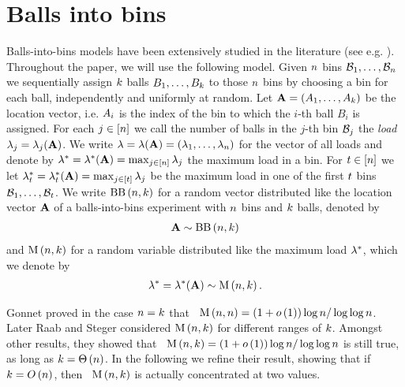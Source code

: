\section{Balls into bins}\label{MDsec:balls_bins}
Balls-into-bins models have been extensively studied in the literature (see e.g. \cite{JohnsonKotz1977, MitzenmacherUpfal2017}). Throughout the paper, we will use the following model. Given $n$ bins $\mathcal{B}_1, \ldots, \mathcal{B}_n$ we sequentially assign $k$ balls $B_1, \ldots, B_k$ to those $n$ bins by choosing a bin for each ball, independently and uniformly at random. Let $\mathbf{A}=\left(A_1, \ldots, A_k\right)$ be the location vector, i.e. $A_i$ is the index of the bin to which the $i$-th ball $B_i$ is assigned. For each $j\in [n]$ we call the number of balls in the $j$-th bin $\mathcal{B}_j$ the {\em load} $\lambda_j=\lambda_j(\mathbf{A})$. We write $\mathbf{\lambda}=\mathbf{\lambda}(\mathbf{A})=\left(\lambda_1, \ldots, \lambda_n\right)$ for the vector of all loads and denote by $\lambda^\ast=\lambda^\ast(\mathbf{A})=\max_{j \in [n]}\lambda_j$ the maximum load in a bin. For $t\in[n]$ we let $\lambda^\ast_{ t}=\lambda^\ast_{t}(\mathbf{A})=\max_{j \in [t]}\lambda_j$ be the maximum load in one of the first $t$ bins $\mathcal{B}_1, \ldots, \mathcal{B}_t$. We write $\operatorname{BB}\left(n, k\right)$ for a random vector distributed like the location vector $\mathbf{A}$ of a balls-into-bins experiment with $n$ bins and $k$ balls, denoted by 
\begin{align*}
\mathbf{A}\sim \operatorname{BB}\left(n, k\right)
\end{align*}
and $\operatorname{M}\left(n, k\right)$ for a random variable distributed like the maximum load $\lambda^\ast$, which we denote by
\begin{align*}
\lambda^\ast=\lambda^\ast(\mathbf{A})\sim \operatorname{M}\left(n, k\right).
\end{align*}

Gonnet \cite{Gonnet1981} proved in the case $n=k$ that \whp\ $\operatorname{M}\left(n, n\right)=\left(1+o\left(1\right)\right)\log n/\log\log n$. Later Raab and Steger \cite{RaabSteger1998} considered $\operatorname{M}\left(n, k\right)$ for different ranges of $k$. Amongst other results, they showed that \whp\ $\operatorname{M}\left(n, k\right)=\left(1+o\left(1\right)\right)\log n/\log\log n$ is still true, as long as $k=\Theta\left(n\right)$. In the following we refine their result, showing that if $k=O\left(n\right)$, then \whp\ $\operatorname{M}\left(n, k\right)$ is actually concentrated at two values.

